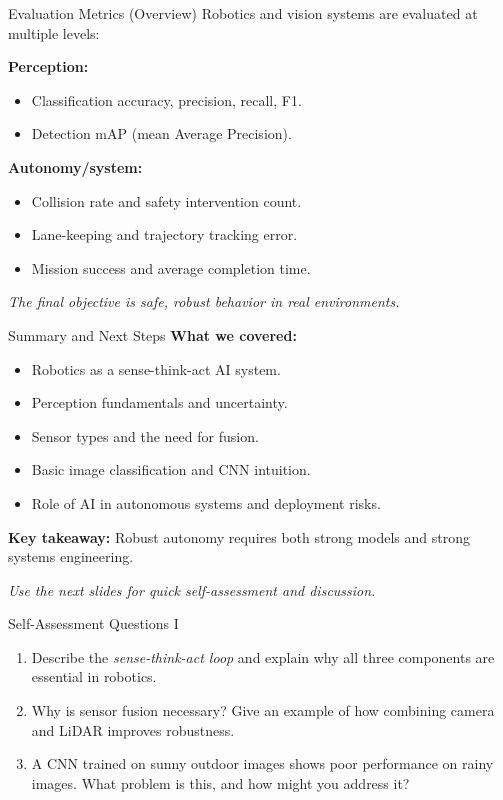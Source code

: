\documentclass[10pt]{beamer}
\begin{document}
\begin{frame}{Evaluation Metrics (Overview)}
    Robotics and vision systems are evaluated at multiple levels:

    \vspace{0.1cm}
    \textbf{Perception:}
    \begin{itemize}
        \item Classification accuracy, precision, recall, F1.
        \item Detection mAP (mean Average Precision).
    \end{itemize}

    \vspace{0.1cm}
    \textbf{Autonomy/system:}
    \begin{itemize}
        \item Collision rate and safety intervention count.
        \item Lane-keeping and trajectory tracking error.
        \item Mission success and average completion time.
    \end{itemize}

    \vspace{0.1cm}
    \textit{The final objective is safe, robust behavior in real environments.}
\end{frame}

\begin{frame}{Summary and Next Steps}
    \textbf{What we covered:}
    \begin{itemize}
        \item Robotics as a sense-think-act AI system.
        \item Perception fundamentals and uncertainty.
        \item Sensor types and the need for fusion.
        \item Basic image classification and CNN intuition.
        \item Role of AI in autonomous systems and deployment risks.
    \end{itemize}

    \vspace{0.2cm}
    \textbf{Key takeaway:} Robust autonomy requires both strong models and strong systems engineering.

    \vspace{0.3cm}
    \textit{Use the next slides for quick self-assessment and discussion.}
\end{frame}

\begin{frame}{Self-Assessment Questions I}
    \begin{enumerate}
        \item Describe the \textit{sense-think-act loop} and explain why all three components are essential in robotics.
        \item Why is sensor fusion necessary? Give an example of how combining camera and LiDAR improves robustness.
        \item A CNN trained on sunny outdoor images shows poor performance on rainy images. What problem is this, and how might you address it?
    \end{enumerate}
\end{frame}
\end{document}
